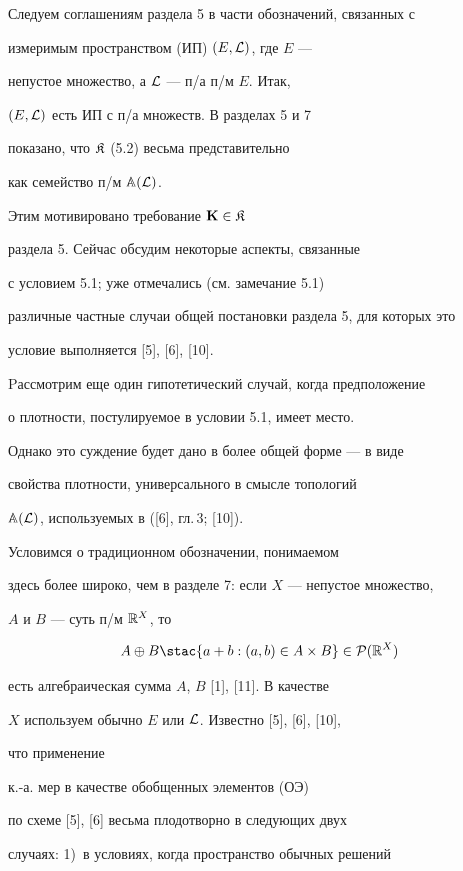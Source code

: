 Следуем соглашениям раздела 5 в части обозначений, связанных с


измеримым пространством (ИП) $(E,{\cal L})$, где $E$ ---


непустое множество, а ${\cal L}$ --- п/а п/м $E$. Итак,


$(E,{\cal L})$ есть ИП с п/а множеств. В разделах 5 и 7


показано, что ${\frak K}$ (5.2) весьма представительно


как семейство п/м ${\Bbb A}({\cal L})$.


Этим мотивировано требование ${\bold K} \in {\frak K}$


раздела 5. Сейчас обсудим некоторые аспекты, связанные


с условием 5.1; уже отмечались (см. замечание 5.1)


различные частные случаи общей постановки раздела 5, для которых это


условие выполняется [5], [6], [10].


Pассмотрим еще один гипотетический случай, когда предположение


о плотности, постулируемое в условии 5.1, имеет место.


Однако это суждение будет дано в более общей форме --- в виде


свойства плотности, универсального в смысле топологий


${{\Bbb A}({\cal L})}$, используемых в ([6], гл.\,3; [10]).


Условимся о традиционном обозначении, понимаемом


здесь более широко, чем в разделе 7: если $X$ --- непустое множество,


$A$ и $B$ --- суть п/м ${{\Bbb R}^X}$, то


$$


A \oplus B \stac \{a + b:(a,b) \in A \times B\} \in


{\cal P}({\Bbb R}^X)


$$


есть алгебраическая сумма $A$, $B$ [1], [11]. В качестве


$X$ используем обычно $E$ или ${\cal L}$. Известно [5], [6], [10],


что применение


к.-а. мер в качестве обобщенных элементов (ОЭ)


по схеме [5], [6] весьма плодотворно в следующих двух


случаях: 1)~в условиях, когда пространство обычных решений


